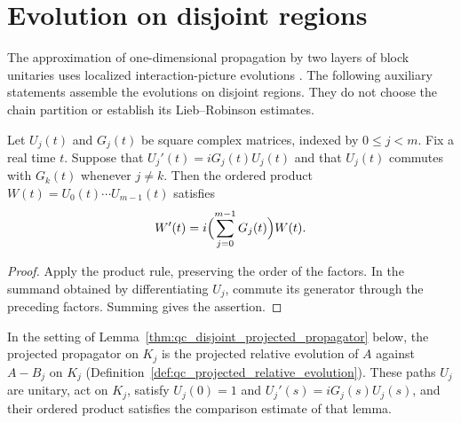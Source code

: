 \section{Evolution on disjoint regions}
\label{sec:qc_disjoint_relative_evolution}

The approximation of one-dimensional propagation by two layers of block
unitaries uses localized interaction-picture evolutions
\cite{Osborne2006Dynamics,Huang2015GroundState}. The following auxiliary
statements assemble the evolutions on disjoint regions. They do not choose
the chain partition or establish its Lieb--Robinson estimates.

\begin{lemma}
    \label{thm:qc_disjoint_evolution_product_rule}
    \leanok
    Let $U_j(t)$ and $G_j(t)$ be square complex matrices, indexed by
    $0\le j<m$. Fix a real time $t$. Suppose that
    $U_j'(t)=iG_j(t)U_j(t)$ and that $U_j(t)$ commutes with
    $G_k(t)$ whenever $j\ne k$. Then the ordered product
    $W(t)=U_0(t)\cdots U_{m-1}(t)$ satisfies
    \begin{align}
        W'(t)=i\Bigl(\sum_{j=0}^{m-1}G_j(t)\Bigr)W(t).
    \end{align}
\end{lemma}
\begin{proof}
    \leanok
    Apply the product rule, preserving the order of the factors. In the
    summand obtained by differentiating $U_j$, commute its generator
    through the preceding factors. Summing gives the assertion.
\end{proof}

\begin{definition}
    \label{def:qc_disjoint_projected_propagator}
    \leanok
    In the setting of Lemma~\ref{thm:qc_disjoint_projected_propagator} below,
    the projected propagator on $K_j$ is the projected relative evolution of
    $A$ against $A-B_j$ on $K_j$ (Definition~\ref{def:qc_projected_relative_evolution}).
    These paths $U_j$ are unitary, act on $K_j$, satisfy $U_j(0)=1$ and
    $U_j'(s)=iG_j(s)U_j(s)$, and their ordered product satisfies the
    comparison estimate of that lemma.
\end{definition}

